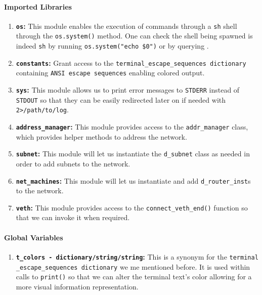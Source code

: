     \paragraph{Imported Libraries}
        \begin{enumerate}
            \item \textbf{\texttt{os}:} This module enables the execution of commands through a \texttt{sh} shell through the \texttt{os.system()} method. One can check the shell being spawned is indeed \texttt{sh} by running \texttt{\allowbreak os.system("echo \$0")} or by querying \cite{bib:man-system}.
            \item \textbf{\texttt{constants}:} Grant access to the \texttt{\allowbreak terminal\_escape\_sequences dictionary} containing \texttt{ANSI escape sequences} enabling colored output.
            \item \textbf{\texttt{sys}:} This module allows us to print error messages to \texttt{STDERR} instead of \texttt{STDOUT} so that they can be easily redirected later on if needed with \texttt{2>/path/to/log}.
            \item \textbf{\texttt{address\_manager}:} This module provides access to the \texttt{addr\_manager} class, which provides helper methods to address the network.
            \item \textbf{\texttt{subnet}:} This module will let us instantiate the \texttt{d\_subnet} class as needed in order to add subnets to the network.
            \item \textbf{\texttt{net\_machines}:} This module will let us instantiate and add \texttt{d\_router\_inst}s to the network.
            \item \textbf{\texttt{veth}:} This module provides access to the \texttt{connect\_veth\_end()} function so that we can invoke it when required.
        \end{enumerate}

    \paragraph{Global Variables}
        \begin{enumerate}
            \item \textbf{\texttt{\allowbreak t\_colors - dictionary/string/string}:} This is a synonym for the \texttt{\allowbreak terminal \_escape\_sequences dictionary} we me mentioned before. It is used within calls to \texttt{print()} so that we can alter the terminal text's color allowing for a more visual information representation.
        \end{enumerate}

